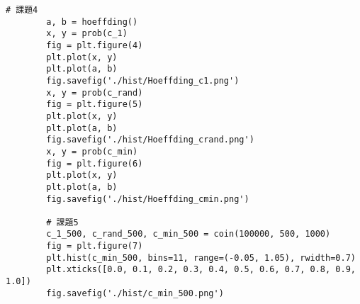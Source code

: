 \begin{lstlisting}[caption=数値シミュレーションプログラム]
        # 課題4
        a, b = hoeffding()
        x, y = prob(c_1)
        fig = plt.figure(4)    
        plt.plot(x, y)
        plt.plot(a, b)
        fig.savefig('./hist/Hoeffding_c1.png')
        x, y = prob(c_rand)
        fig = plt.figure(5)    
        plt.plot(x, y)
        plt.plot(a, b)
        fig.savefig('./hist/Hoeffding_crand.png')
        x, y = prob(c_min)
        fig = plt.figure(6)    
        plt.plot(x, y)
        plt.plot(a, b)
        fig.savefig('./hist/Hoeffding_cmin.png')

        # 課題5
        c_1_500, c_rand_500, c_min_500 = coin(100000, 500, 1000)
        fig = plt.figure(7)
        plt.hist(c_min_500, bins=11, range=(-0.05, 1.05), rwidth=0.7)
        plt.xticks([0.0, 0.1, 0.2, 0.3, 0.4, 0.5, 0.6, 0.7, 0.8, 0.9, 1.0])
        fig.savefig('./hist/c_min_500.png')
\end{lstlisting}
